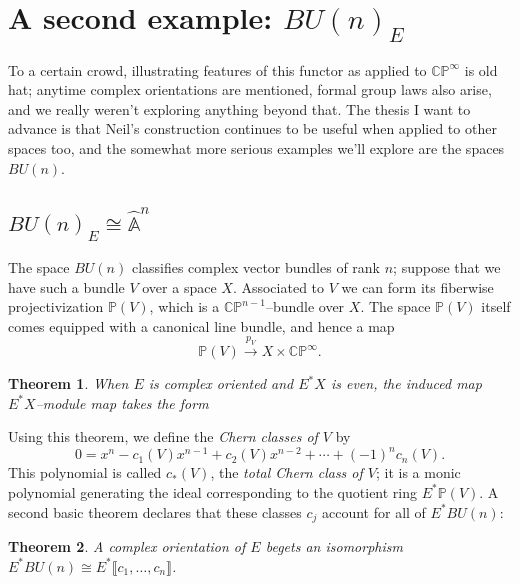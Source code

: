 \documentclass{amsart}
\newcommand{\C}{\mathbb{C}}
\newcommand{\CP}{\C\P}
\newcommand{\A}{\widehat{\mathbb{A}}}
\renewcommand{\P}{\mathbb{P}}
\newcommand{\<}{\langle}
\renewcommand{\>}{\rangle}
\theoremstyle{plain}
\newtheorem*{theorem}{Theorem}
\theoremstyle{definition}
\theoremstyle{remark}
\begin{document}
\section{A second example: $BU(n)_E$}

To a certain crowd, illustrating features of this functor as applied to $\CP^\infty$ is old hat; anytime complex orientations are mentioned, formal group laws also arise, and we really weren't exploring anything beyond that.  The thesis I want to advance is that Neil's construction continues to be useful when applied to other spaces too, and the somewhat more serious examples we'll explore are the spaces $BU(n)$.

\subsection{$BU(n)_E \cong \A^n$}

The space $BU(n)$ classifies complex vector bundles of rank $n$; suppose that we have such a bundle $V$ over a space $X$.  Associated to $V$ we can form its fiberwise projectivization $\P(V)$, which is a $\CP^{n-1}$--bundle over $X$.  The space $\P(V)$ itself comes equipped with a canonical line bundle, and hence a map \[\P(V) \xrightarrow{p_V} X \times \CP^\infty.\]

\begin{theorem}
When $E$ is complex oriented and $E^* X$ is even, the induced map $E^* X$--module map takes the form
\begin{center}
\end{center}
\end{theorem}

\noindent Using this theorem, we define the \emph{Chern classes of $V$} by \[0 = x^n - c_1(V) x^{n-1} + c_2(V) x^{n-2} + \cdots + (-1)^n c_n(V).\]  This polynomial is called $c_*(V)$, the \emph{total Chern class of $V$}; it is a monic polynomial generating the ideal corresponding to the quotient ring $E^* \P(V)$.  A second basic theorem declares that these classes $c_j$ account for all of $E^* BU(n)$:

\begin{theorem}
A complex orientation of $E$ begets an isomorphism $E^* BU(n) \cong E^*\llbracket c_1, \ldots, c_n \rrbracket$.
\end{theorem}
\end{document}
